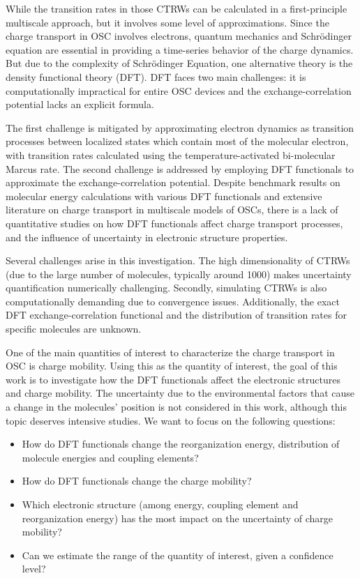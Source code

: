 \documentclass[letterpaper,12pt]{article}
\begin{document}
While the transition rates in those CTRWs can be calculated in a first-principle multiscale approach, but it involves some level of approximations. 
Since the charge transport in OSC involves electrons, quantum mechanics and Schr\"odinger equation are essential in providing a time-series behavior of the charge dynamics. 
But due to the complexity of Schr\"odinger Equation, one alternative theory is the density functional theory (DFT). 
DFT faces two main challenges: it is computationally impractical for entire OSC devices and the exchange-correlation potential lacks an explicit formula.

The first challenge is mitigated by approximating electron dynamics as transition processes between localized states which contain most of the molecular electron, with transition rates calculated using the temperature-activated bi-molecular Marcus rate. 
The second challenge is addressed by employing DFT functionals to approximate the exchange-correlation potential. 
Despite benchmark results on molecular energy calculations with various DFT functionals and extensive literature on charge transport in multiscale models of OSCs, there is a lack of quantitative studies on how DFT functionals affect charge transport processes, and the influence of uncertainty in electronic structure properties.

Several challenges arise in this investigation. The high dimensionality of CTRWs (due to the large number of molecules, typically around 1000) makes uncertainty quantification numerically challenging. Secondly, simulating CTRWs is also computationally demanding due to convergence issues. Additionally, the exact DFT exchange-correlation functional and the distribution of transition rates for specific molecules are unknown.


One of the main quantities of interest to characterize the charge transport in OSC is charge mobility. Using this as the quantity of interest,
the goal of this work is to investigate how the DFT functionals affect the electronic structures and charge mobility. The uncertainty due to the environmental factors that cause a change in the molecules' position is not considered in this work, although this topic deserves intensive studies.
We want to focus on the following questions: 
\begin{itemize}
    \item How do DFT functionals change the reorganization energy, distribution of molecule energies and coupling elements? 
    \item How do DFT functionals change the charge mobility?
    \item Which electronic structure (among energy, coupling element and reorganization energy) has the most impact on the uncertainty of charge mobility?
    \item Can we estimate the range of the quantity of interest, given a confidence level?
\end{itemize}
\end{document}
